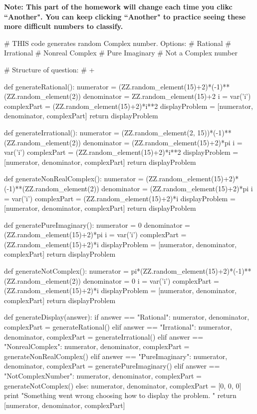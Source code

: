 \documentclass{ximera}
\begin{document}
\textbf{Note: This part of the homework will change each time you clikc ``Another". You can keep clicking ``Another" to practice seeing these more difficult numbers to classify.}

\begin{sagesilent}
# THIS code generates random Complex number. Options:
    # Rational
    # Irrational
    # Nonreal Complex
    # Pure Imaginary
    # Not a Complex number

# Structure of question:
    #   + 

def generateRational():
    numerator = (ZZ.random_element(15)+2)*(-1)**(ZZ.random_element(2))
    denominator = ZZ.random_element(15)+2
    i = var('i')
    complexPart = (ZZ.random_element(15)+2)*i**2
    displayProblem = [numerator, denominator, complexPart]
    return displayProblem

def generateIrrational():
    numerator = (ZZ.random_element(2, 15))*(-1)**(ZZ.random_element(2))
    denominator = (ZZ.random_element(15)+2)*pi
    i = var('i')
    complexPart = (ZZ.random_element(15)+2)*i**2
    displayProblem = [numerator, denominator, complexPart]
    return displayProblem

def generateNonRealComplex():
    numerator = (ZZ.random_element(15)+2)*(-1)**(ZZ.random_element(2))
    denominator = (ZZ.random_element(15)+2)*pi
    i = var('i')
    complexPart = (ZZ.random_element(15)+2)*i
    displayProblem = [numerator, denominator, complexPart]
    return displayProblem

def generatePureImaginary():
    numerator = 0
    denominator = (ZZ.random_element(15)+2)*pi
    i = var('i')
    complexPart = (ZZ.random_element(15)+2)*i
    displayProblem = [numerator, denominator, complexPart]
    return displayProblem

def generateNotComplex():
    numerator = pi*(ZZ.random_element(15)+2)*(-1)**(ZZ.random_element(2))
    denominator = 0
    i = var('i')
    complexPart = (ZZ.random_element(15)+2)*i
    displayProblem = [numerator, denominator, complexPart]
    return displayProblem

def generateDisplay(answer):
    if answer == "Rational":
        numerator, denominator, complexPart = generateRational()
    elif answer == "Irrational":
        numerator, denominator, complexPart = generateIrrational()
    elif answer == "NonrealComplex":
        numerator, denominator, complexPart = generateNonRealComplex()
    elif answer == "PureImaginary":
        numerator, denominator, complexPart = generatePureImaginary()
    elif answer == "NotComplexNumber":
        numerator, denominator, complexPart = generateNotComplex()
    else:
        numerator, denominator, complexPart = [0, 0, 0]
        print "\n\n\n Something went wrong choosing how to display the problem. \n\n\n\n"
    return [numerator, denominator, complexPart]


\end{sagesilent}
\end{document}
